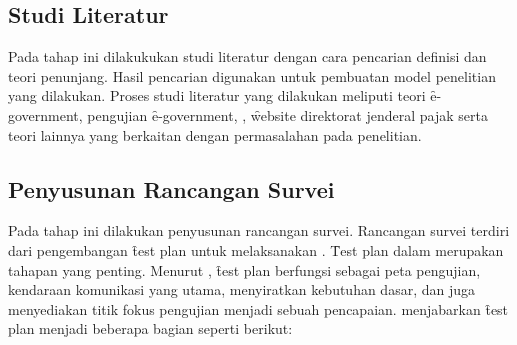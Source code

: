 \subsection{Studi Literatur}
Pada tahap ini dilakukukan studi literatur dengan cara pencarian definisi dan teori penunjang. Hasil pencarian digunakan untuk pembuatan model penelitian yang dilakukan. Proses studi literatur yang dilakukan meliputi teori \f{e-government}, pengujian \f{e-government}, \ust, \f{website} direktorat jenderal pajak serta teori lainnya yang berkaitan dengan permasalahan pada penelitian.
\subsection{Penyusunan Rancangan Survei}
Pada tahap ini dilakukan penyusunan rancangan survei. Rancangan survei terdiri dari pengembangan \f{test plan} untuk melaksanakan \ust. \f{Test plan} dalam \ust \space merupakan tahapan yang penting. Menurut \citet{buku.rubin}, \f{test plan} berfungsi sebagai peta pengujian, kendaraan komunikasi yang utama,  menyiratkan kebutuhan dasar, dan juga menyediakan titik fokus pengujian menjadi sebuah pencapaian. \citeauthor{buku.rubin} menjabarkan \f{test plan} menjadi beberapa bagian seperti berikut:

